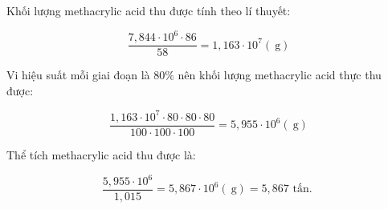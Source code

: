 \documentclass[10pt]{article}
\begin{document}
Khối lượng methacrylic acid thu được tính theo lí thuyết:

$$
\frac{7,844 \cdot 10^{6} \cdot 86}{58}=1,163 \cdot 10^{7}(\mathrm{~g})
$$

Vi hiệu suất mỗi giai đoạn là $80 \%$ nên khối lượng methacrylic acid thực thu được:

$$
\frac{1,163 \cdot 10^{7} \cdot 80 \cdot 80 \cdot 80}{100 \cdot 100 \cdot 100}=5,955 \cdot 10^{6}(\mathrm{~g})
$$

Thể tích methacrylic acid thu được là:

$$
\frac{5,955 \cdot 10^{6}}{1,015}=5,867 \cdot 10^{6}(\mathrm{~g})=5,867 \text { tấn. }
$$
\end{document}
